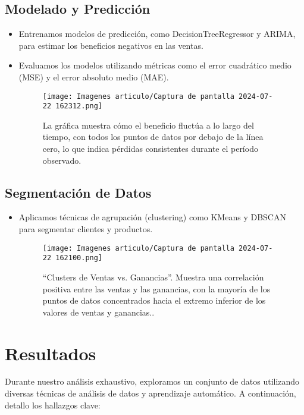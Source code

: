\documentclass[preprint,12pt]{elsarticle}
\begin{document}
\subsection{Modelado y Predicción}
\begin{itemize}
    \item Entrenamos modelos de predicción, como DecisionTreeRegressor y ARIMA, para estimar los beneficios negativos en las ventas.
    \item Evaluamos los modelos utilizando métricas como el error cuadrático medio (MSE) y el error absoluto medio (MAE).
\begin{figure}[h]
    \centering
    \texttt{[image: Imagenes articulo/Captura de pantalla 2024-07-22 162312.png]} 
    \caption{La gráfica muestra cómo el beneficio fluctúa a lo largo del tiempo, con todos los puntos de datos por debajo de la línea cero, lo que indica pérdidas consistentes durante el período observado.}
    \label{fig:qqplot_profit}
\end{figure}

\end{itemize}

\subsection{Segmentación de Datos}
\begin{itemize}
    \item Aplicamos técnicas de agrupación (clustering) como KMeans y DBSCAN para segmentar clientes y productos.

\begin{figure}[h]
    \centering
    \texttt{[image: Imagenes articulo/Captura de pantalla 2024-07-22 162100.png]} 
    \caption{“Clusters de Ventas vs. Ganancias”. Muestra una correlación positiva entre las ventas y las ganancias, con la mayoría de los puntos de datos concentrados hacia el extremo inferior de los valores de ventas y ganancias..}
    \label{fig:qqplot_profit}
\end{figure}
\end{itemize}

\section*{Resultados}
Durante nuestro análisis exhaustivo, exploramos un conjunto de datos utilizando diversas técnicas de análisis de datos y aprendizaje automático. A continuación, detallo los hallazgos clave:
\end{document}
